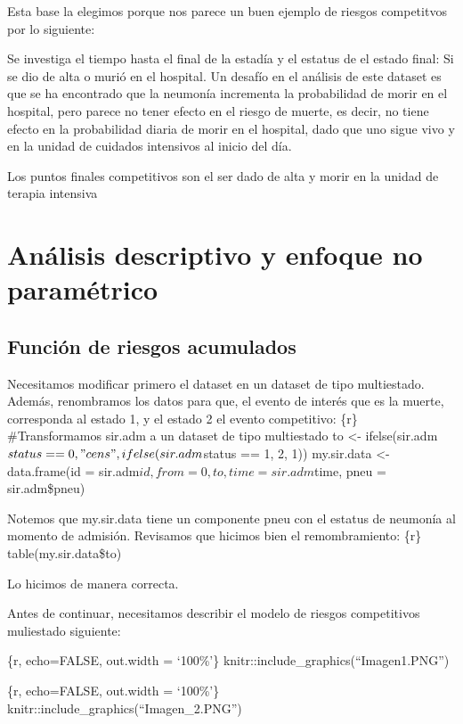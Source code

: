\documentclass[
]{article}
\begin{document}
Esta base la elegimos porque nos parece un buen ejemplo de riesgos
competitvos por lo siguiente:

Se investiga el tiempo hasta el final de la estadía y el estatus de el
estado final: Si se dio de alta o murió en el hospital. Un desafío en el
análisis de este dataset es que se ha encontrado que la neumonía
incrementa la probabilidad de morir en el hospital, pero parece no tener
efecto en el riesgo de muerte, es decir, no tiene efecto en la
probabilidad diaria de morir en el hospital, dado que uno sigue vivo y
en la unidad de cuidados intensivos al inicio del día.

Los puntos finales competitivos son el ser dado de alta y morir en la
unidad de terapia intensiva

\hypertarget{anuxe1lisis-descriptivo-y-enfoque-no-paramuxe9trico}{%
\section{Análisis descriptivo y enfoque no
paramétrico}\label{anuxe1lisis-descriptivo-y-enfoque-no-paramuxe9trico}}

\hypertarget{funciuxf3n-de-riesgos-acumulados}{%
\subsection{Función de riesgos
acumulados}\label{funciuxf3n-de-riesgos-acumulados}}

Necesitamos modificar primero el dataset en un dataset de tipo
multiestado. Además, renombramos los datos para que, el evento de
interés que es la muerte, corresponda al estado 1, y el estado 2 el
evento competitivo: \{r\} \#Transformamos sir.adm a un dataset de tipo
multiestado to \textless-
ifelse(sir.adm\(status == 0, "cens", ifelse(sir.adm\)status == 1, 2, 1))
my.sir.data \textless- data.frame(id =
sir.adm\(id, from = 0, to, time = sir.adm\)time, pneu = sir.adm\$pneu)

Notemos que my.sir.data tiene un componente pneu con el estatus de
neumonía al momento de admisión. Revisamos que hicimos bien el
remombramiento: \{r\} table(my.sir.data\$to)

Lo hicimos de manera correcta.

Antes de continuar, necesitamos describir el modelo de riesgos
competitivos muliestado siguiente:

\{r, echo=FALSE, out.width = `100\%'\}
knitr::include\_graphics(``Imagen1.PNG'')

\{r, echo=FALSE, out.width = `100\%'\}
knitr::include\_graphics(``Imagen\_2.PNG'')
\end{document}
